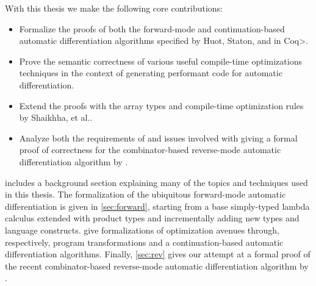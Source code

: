 With this thesis we make the following core contributions:
\begin{itemize}
  \item Formalize the proofs of both the forward-mode and continuation-based automatic differentiation algorithms specified by Huot, Staton, and \Vakar{} \cite{huot2020correctness} in \<Coq>.
  \item Prove the semantic correctness of various useful compile-time optimizations techniques in the context of generating performant code for automatic differentiation.
  \item Extend the proofs with the array types and compile-time optimization rules by Shaikhha, et al.\cite{Shaikha2019}.
  \item Analyze both the requirements of and issues involved with giving a formal proof of correctness for the combinator-based reverse-mode automatic differentiation algorithm by \Vakar{}\cite{vkr2020reverse}.
\end{itemize}

 includes a background section explaining many of the topics and techniques used in this thesis. The formalization of the ubiquitous forward-mode automatic differentiation is given in \cref{sec:forward}, starting from a base simply-typed lambda calculus extended with product types and incrementally adding new types and language constructs.  give formalizations of optimization avenues through, respectively, program transformations and a continuation-based automatic differentiation algorithms.
Finally, \cref{sec:rev} gives our attempt at a formal proof of the recent combinator-based reverse-mode automatic differentiation algorithm by \Vakar{}\cite{vkr2020reverse}.

